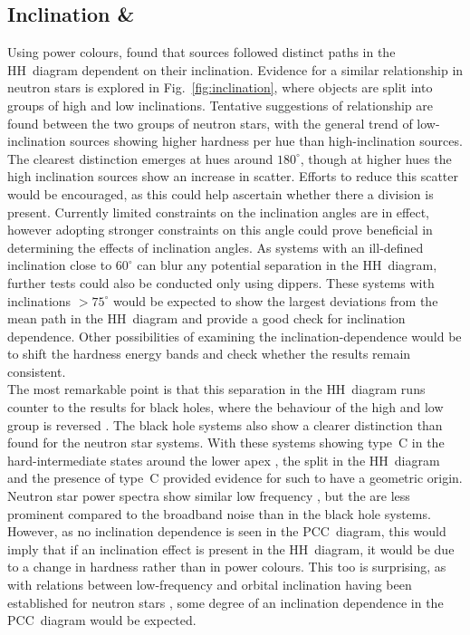 \subsection{Inclination \& }
\label{sec:dis_incl}
Using power colours, \citet{heil2015inclination} found that sources followed distinct paths in the \ac{HH}~diagram dependent on their inclination. Evidence for a similar relationship in neutron stars is explored in Fig.~\ref{fig:inclination}, where objects are split into groups of high and low inclinations. Tentative suggestions of relationship are found between the two groups of neutron stars, with the general trend of low-inclination sources showing higher hardness per hue than high-inclination sources. The clearest distinction emerges at hues around $180^\circ$, though at higher hues the high inclination sources show an increase in scatter. Efforts to reduce this scatter would be encouraged, as this could help ascertain whether there a division is present. Currently limited constraints on the inclination angles are in effect, however adopting stronger constraints on this angle could prove beneficial in determining the effects of inclination angles. As systems with an ill-defined inclination close to $60^\circ$ can blur any potential separation in the \ac{HH}~diagram, further tests could also be conducted only using dippers. These systems with inclinations $>\!75^\circ$ would be expected to show the largest deviations from the mean path in the \ac{HH}~diagram and provide a good check for inclination dependence. Other possibilities of examining the inclination-dependence would be to shift the hardness energy bands and check whether the results remain consistent.\\

The most remarkable point is that this separation in the \ac{HH}~diagram runs counter to the results for black holes, where the behaviour of the high and low group is reversed \citep{heil2015inclination}. The black hole systems also show a clearer distinction than found for the neutron star systems. With these systems showing type~C \QPOs in the hard-intermediate states around the lower apex \citep{heil2015inclination}, the split in the \ac{HH}~diagram and the presence of type~C \QPOs provided evidence for such \QPOs to have a geometric origin. Neutron star power spectra show similar low frequency \QPOs, but the \QPOs are less prominent compared to the broadband noise than in the black hole systems. However, as no inclination dependence is seen in the \ac{PCC}~diagram, this would imply that if an inclination effect is present in the \ac{HH}~diagram, it would be due to a change in hardness rather than in power colours. This too is surprising, as with relations between low-frequency \QPOs and orbital inclination having been established for neutron stars \citep{homan2015geometric}, some degree of an inclination dependence in the \ac{PCC}~diagram would be expected.\\

